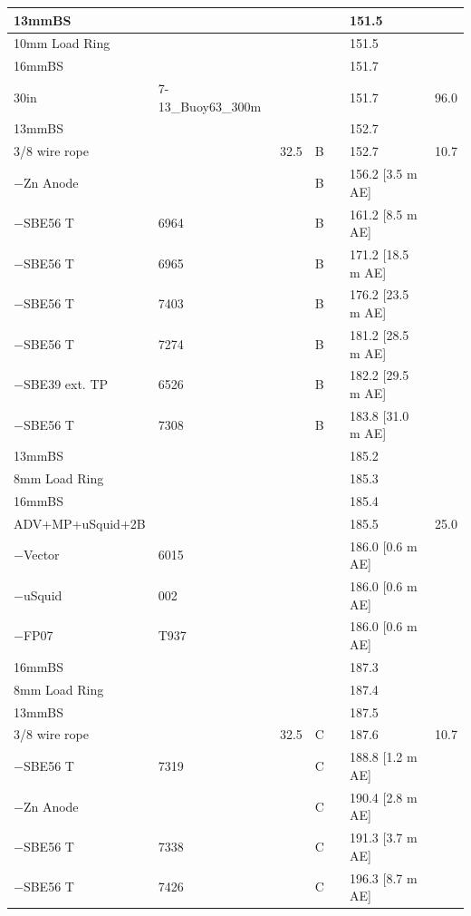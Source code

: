 \documentclass{article}
\begin{document}
\begin{tabularx}{\linewidth}{|X|X|l|l|l|X|l|}
13mmBS &  &  &  &  & 151.5 &  \\ \hline
10mm Load Ring &  &  &  &  & 151.5 &  \\ \hline
16mmBS &  &  &  &  & 151.7 &  \\ \hline
30in & 7-13\_Buoy63\_300m &  &  &  & 151.7 & 96.0 \\ \hline
13mmBS &  &  &  &  & 152.7 &  \\ \hline
3/8 wire rope &  & 32.5 & B &  & 152.7 & 10.7 \\ \hline
$-$Zn Anode &  &  & B &  & 156.2 [3.5 m AE] &  \\ \hline
$-$SBE56 T & 6964 &  & B &  & 161.2 [8.5 m AE] &  \\ \hline
$-$SBE56 T & 6965 &  & B &  & 171.2 [18.5 m AE] &  \\ \hline
$-$SBE56 T & 7403 &  & B &  & 176.2 [23.5 m AE] &  \\ \hline
$-$SBE56 T & 7274 &  & B &  & 181.2 [28.5 m AE] &  \\ \hline
$-$SBE39 ext. TP & 6526 &  & B &  & 182.2 [29.5 m AE] &  \\ \hline
$-$SBE56 T & 7308 &  & B &  & 183.8 [31.0 m AE] &  \\ \hline
13mmBS &  &  &  &  & 185.2 &  \\ \hline
8mm Load Ring &  &  &  &  & 185.3 &  \\ \hline
16mmBS &  &  &  &  & 185.4 &  \\ \hline
ADV+MP+uSquid+2B &  &  &  &  & 185.5 & 25.0 \\ \hline
$-$Vector & 6015 &  &  &  & 186.0 [0.6 m AE] &  \\ \hline
$-$uSquid & 002 &  &  &  & 186.0 [0.6 m AE] &  \\ \hline
$-$FP07 & T937 &  &  &  & 186.0 [0.6 m AE] &  \\ \hline
16mmBS &  &  &  &  & 187.3 &  \\ \hline
8mm Load Ring &  &  &  &  & 187.4 &  \\ \hline
13mmBS &  &  &  &  & 187.5 &  \\ \hline
3/8 wire rope &  & 32.5 & C &  & 187.6 & 10.7 \\ \hline
$-$SBE56 T & 7319 &  & C &  & 188.8 [1.2 m AE] &  \\ \hline
$-$Zn Anode &  &  & C &  & 190.4 [2.8 m AE] &  \\ \hline
$-$SBE56 T & 7338 &  & C &  & 191.3 [3.7 m AE] &  \\ \hline
$-$SBE56 T & 7426 &  & C &  & 196.3 [8.7 m AE] &  \\ \hline

\end{tabularx}
\end{document}
